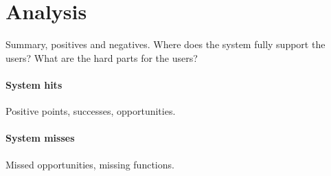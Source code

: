 \section{Analysis}
Summary, positives and negatives. Where does the system fully support the users? What are the hard parts for the users?
\paragraph{System hits}
Positive points, successes, opportunities.
\paragraph{System misses}
Missed opportunities, missing functions.
